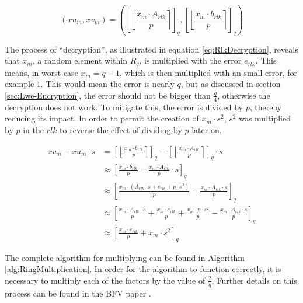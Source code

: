 \begin{equation}
  (xu_m, xv_m) = \left(\left[\left\lfloor \frac{x_m \cdot A_{rlk}}{p}  \right\rceil \right]_q, \left[\left\lfloor \frac{x_m \cdot b_{rlk}}{p}  \right\rceil \right]_q\right)
  \label{eq:ringXmSplitting}
\end{equation}

The process of ``decryption'', as illustrated in equation \ref{eq:RlkDecryption}, reveals that $x_m$, a random element within $R_q$, is multiplied with the error $e_{rlk}$. This means, in worst case $x_m = q-1$, which is then multiplied with an small error, for example $1$. This would mean the error is nearly $q$, but as discussed in section \ref{sec:Lwe-Encryption}, the error should not be bigger than $\frac{q}{4}$, otherwise the decryption does not work. To mitigate this, the error is divided by $p$, thereby reducing its impact. In order to permit the creation of $x_m \cdot s^2$, $s^2$ was multiplied by $p$ in the $rlk$ to reverse the effect of dividing by $p$ later on.

\begin{equation}
  \begin{split}
    xv_m - xu_m \cdot s & = \left[\left\lfloor \frac{x_m \cdot b_{rlk}}{p}  \right\rceil \right]_q - \left[\left\lfloor \frac{x_m \cdot A_{rlk}}{p}  \right\rceil \right]_q \cdot s  \\
                        & \approx \left[\frac{x_m \cdot b_{rlk}}{p} - \frac{x_m \cdot A_{rlk}}{p} \cdot s\right]_q                                                                   \\
                        & \approx \left[\frac{x_m \cdot (A_{rlk}\cdot s+e_{rlk}+p\cdot s^2)}{p} - \frac{x_m \cdot A_{rlk} \cdot s}{p}\right]_q                                       \\
                        & \approx \left[\frac{x_m \cdot A_{rlk}\cdot s}{p}+\frac{x_m \cdot e_{rlk}}{p}+\frac{x_m \cdot p\cdot s^2}{p} - \frac{x_m \cdot A_{rlk} \cdot s}{p}\right]_q \\
                        & \approx \left[\frac{x_m \cdot e_{rlk}}{p}+ x_m \cdot s^2 \right]_q
  \end{split}
  \label{eq:RlkDecryption}
\end{equation}

The complete algorithm for multiplying can be found in Algorithm \ref{alg:RingMultiplication}. In order for the algorithm to function correctly, it is necessary to multiply each of the factors by the value of $\frac{2}{q}$. Further details on this process can be found in the BFV paper \cite{bfv}.

